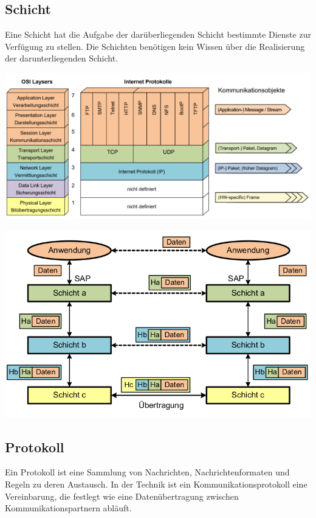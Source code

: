 \subsection{Schicht}
{Eine Schicht hat die Aufgabe der darüberliegenden Schicht bestimmte
    Dienste zur Verfügung zu stellen. Die Schichten benötigen kein Wissen über die Realisierung
    der darunterliegenden Schicht.

        {\includegraphics[scale=.4]{img/osi-1.png}}

        {\includegraphics[scale=.3]{img/osi-2.png}}}
\subsection{Protokoll}
{Ein Protokoll ist eine Sammlung von Nachrichten, Nachrichtenformaten und Regeln zu deren Austausch.
    In der Technik ist ein Kommunikationsprotokoll eine Vereinbarung, die festlegt wie eine Datenübertragung zwischen Kommunikationspartnern abläuft.}
